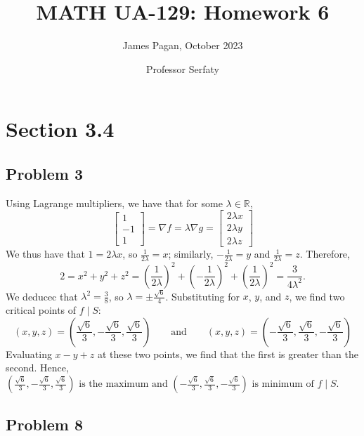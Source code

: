 \documentclass[11pt]{article}
\title{MATH UA-129: Homework 6}
\author{James Pagan, October 2023}
\date{Professor Serfaty}
\renewcommand{\grad}{\nabla}
\begin{document}
\maketitle
\tableofcontents


\section{Section 3.4}


\subsection*{Problem 3}

Using Lagrange multipliers, we have that for some $\lambda \in \mathbb{R}$,
\[
	\begin{bmatrix} 1 \\ -1 \\ 1 \end{bmatrix} = \grad f = \lambda \grad g = \begin{bmatrix} 2\lambda x \\ 2\lambda y \\ 2 \lambda z \end{bmatrix}
\]
We thus have that $1 = 2\lambda x$, so $\tfrac{1}{2\lambda} = x$; similarly, $-\tfrac{1}{2\lambda} = y$ and $\tfrac{1}{2\lambda} = z$. Therefore,
\[
	2 = x^{2} + y^{2} + z^{2} = \left( \frac{1}{2\lambda} \right)^{2} + \left( -\frac{1}{2\lambda} \right)^{2} + \left( \frac{1}{2\lambda} \right)^{2} = \frac{3}{4\lambda^{2}}.
\]
We deducec that $\lambda^{2} = \tfrac{3}{8}$, so $\lambda = \pm \tfrac{\sqrt{6}}{4}$. Substituting for $x$, $y$, and $z$, we find two critical points of $f \mid S$:
\[
	(x, y, z) = \left( \frac{\sqrt{6}}{3}, -\frac{\sqrt{6}}{3}, \frac{\sqrt{6}}{3} \right) \qquad \text{and} \qquad  (x, y, z) = \left( -\frac{\sqrt{6}}{3}, \frac{\sqrt{6}}{3}, -\frac{\sqrt{6}}{3} \right) 
\]
Evaluating $x - y + z$ at these two points, we find that the first is greater than the second. Hence, $\boxed{\text{$\left( \frac{\sqrt{6}}{3}, -\frac{\sqrt{6}}{3}, \frac{\sqrt{6}}{3} \right)$ is the maximum and $\left( -\frac{\sqrt{6}}{3}, \frac{\sqrt{6}}{3}, -\frac{\sqrt{6}}{3} \right)$ is minimum of $f \mid S$}}$.


\subsection*{Problem 8}
\end{document}
